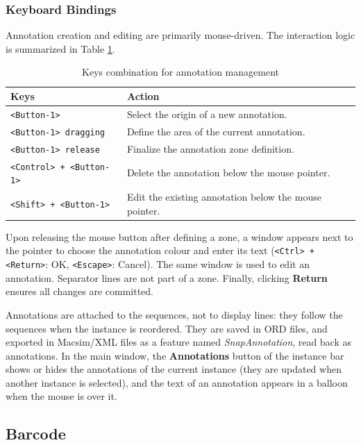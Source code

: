 \documentclass[a4paper]{article}
\begin{document}
\subsubsection{Keyboard Bindings}
Annotation creation and editing are primarily mouse-driven. The interaction logic is summarized in Table \ref{table-keysanno}.

\begin{table}[h!]
\centering
\begin{tabular}{|l|p{10cm}|}
\hline
\textbf{Keys} & \textbf{Action} \\
\hline
\hline
\texttt{<Button-1>} & Select the origin of a new annotation. \\
\texttt{<Button-1> dragging} & Define the area of the current annotation. \\
\texttt{<Button-1> release} & Finalize the annotation zone definition. \\
\hline
\texttt{<Control> + <Button-1>} & Delete the annotation below the mouse pointer. \\
\hline
\texttt{<Shift> + <Button-1>} & Edit the existing annotation below the mouse pointer. \\
\hline
\end{tabular}
\caption{Keys combination for annotation management}
\label{table-keysanno}
\end{table}

Upon releasing the mouse button after defining a zone, a window appears next to the pointer to choose the annotation colour and enter its text (\texttt{<Ctrl> + <Return>}: OK, \texttt{<Escape>}: Cancel). The same window is used to edit an annotation. Separator lines are not part of a zone. Finally, clicking \textbf{Return} ensures all changes are committed.

Annotations are attached to the sequences, not to display lines: they follow the sequences when the instance is reordered. They are saved in ORD files, and exported in Macsim/XML files as a feature named \textit{SnapAnnotation}, read back as annotations. In the main window, the \textbf{Annotations} button of the instance bar shows or hides the annotations of the current instance (they are updated when another instance is selected), and the text of an annotation appears in a balloon when the mouse is over it.


\subsection{Barcode}
\label{tool-barcode}
\end{document}
